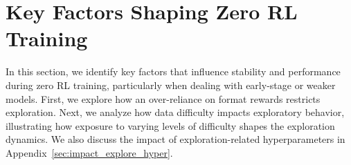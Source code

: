 \documentclass{article} %
\begin{document}









\section{Key Factors Shaping Zero RL Training}
In this section, we identify key factors that influence stability and performance during zero RL training, particularly when dealing with early-stage or weaker models.  
First, we explore how an over-reliance on format rewards restricts exploration. Next, we analyze how data difficulty impacts exploratory behavior, illustrating how exposure to varying levels of difficulty shapes the exploration dynamics. We also discuss the impact of exploration-related hyperparameters in Appendix~\ref{sec:impact_explore_hyper}.
\end{document}
